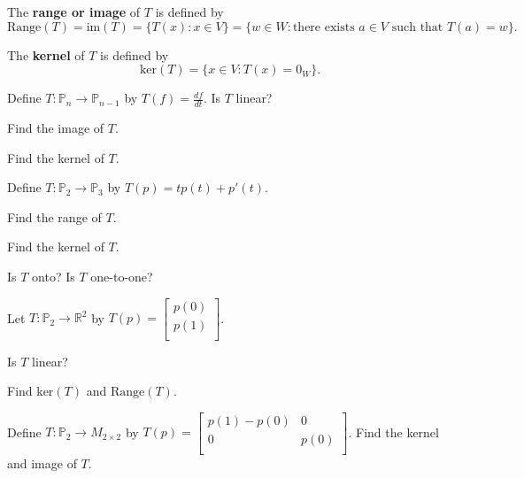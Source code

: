 \begin{enumerate}
\begin{defn}
	The {\bf range or image } of $T$ is defined by $$\text{Range}(T)=\text{im}(T)=\{T(x): x \in V\}=\{w\in W: \text{there exists } a \in V \text{ such that } T(a)=w\}.$$ 
	
	The {\bf kernel} of $T$ is defined by $$\text{ker}(T)=\{ x \in V: T(x)=0_W\}.$$
\end{defn}

\Problem Define $T: \mathbb{P}_n \to \mathbb{P}_{n-1}$ by $T(f)=\frac{df}{dt}$.
\Part Is $T$ linear?

\vfill

\Part Find the image of $T$.

\vfill

\Part Find the kernel of $T$.

\vfill

\newpage

\Problem Define $T: \mathbb{P}_2 \to \mathbb{P}_3$ by $T(p)=t p(t)+p'(t)$.

\Part Find the range of $T$.

\vfill

\Part Find the kernel of $T$.

\vfill 

\Part Is $T$ onto? Is $T$ one-to-one?

\vfill

\newpage

\Problem Let $T: \mathbb{P}_2 \to \mathbb{R}^2$ by $T(p)=\begin{bmatrix} p(0)\\ p(1)\\ \end{bmatrix}$.

\Part Is $T$ linear?

\vfill

\Part Find $\text{ker}(T)$ and $\text{Range}(T)$.

\vfill 

\newpage

\Problem Define $T: \mathbb{P}_2 \to M_{2 \times2 }$ by $T(p)=\begin{bmatrix}
p(1)-p(0) & 0\\
0 & p(0)\\
\end{bmatrix}$. Find the kernel and image of $T$.

\end{enumerate}

